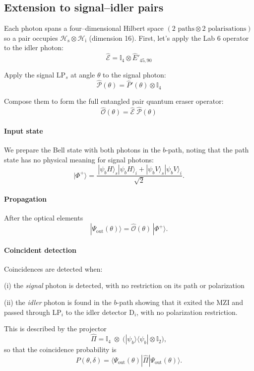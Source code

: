 \documentclass{article}
\begin{document}
\subsection*{Extension to signal–idler pairs}

Each photon spans a four–dimensional Hilbert space
\((2\text{ paths} \otimes 2\text{ polarisations})\)
so a pair occupies
\(\mathcal{H}_{\mathrm{s}}\otimes\mathcal{H}_{\mathrm{i}}\) (dimension 16).
First, let's apply the Lab 6 operator to the idler photon:
\[
\hat{\mathcal{E}}=
\mathbb{I}_{4}\otimes\hat{E}'_{45,90}
\]

Apply the signal LP$_s$ at angle $\theta$ to the signal photon:
\[
\hat{\mathcal{P}}(\theta)=\hat{P}'(\theta)\otimes\mathbb{I}_{4}
\]

Compose them to form the full entangled pair quantum eraser operator:
\[
\hat{\mathcal{O}}(\theta)=\hat{\mathcal{E}}\;\hat{\mathcal{P}}(\theta)
\]

\paragraph{Input state}

We prepare the Bell state with both photons in the \(b\)-path,
noting that the path state has no physical meaning for signal photons:
\[
|\Phi^{+}\rangle=
\frac{\,|\psi_bH\rangle_{\!s}|\psi_bH\rangle_{\!i}
      +|\psi_bV\rangle_{\!s}|\psi_bV\rangle_{\!i}}{\sqrt{2}}.
\]

\paragraph{Propagation}

After the optical elements
\[
|\Psi_{\mathrm{out}}(\theta)\rangle
=\hat{\mathcal{O}}(\theta)\,|\Phi^{+}\rangle.
\]

\paragraph{Coincident detection}
Coincidences are detected when:

(i) the \emph{signal} photon is detected, with no restriction on its path or polarization

(ii) the \emph{idler} photon is found in the \(b\)-path showing that it exited the MZI and passed through LP$_i$ to the idler detector D$_i$, with no polarization restriction.

This is described by the projector
\[
\hat{\Pi}=\mathbb{I}_{4}\;\otimes\;
\bigl(|\psi_b\rangle\langle\psi_b|\otimes\mathbb{I}_{2}\bigr),
\]
so that the coincidence probability is
\[
P(\theta,\delta)=\langle\Psi_{\mathrm{out}}(\theta)|\hat{\Pi}|\Psi_{\mathrm{out}}(\theta)\rangle.
\]
\end{document}
